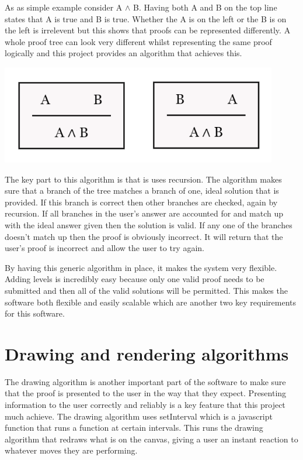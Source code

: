 As as simple example consider A $\wedge$ B. Having both A and B on the top line states that A is true and B is true. Whether the A is on the left or the B is on the left is irrelevent but this shows that proofs can be represented differently. A whole proof tree can look very different whilst representing the same proof logically and this project provides an algorithm that achieves this.

\centerline{\includegraphics[scale=0.5]{unification}}

 The key part to this algorithm is that is uses recursion. The algorithm makes sure that a branch of the tree matches a branch of one, ideal solution that is provided. If this branch is correct then other branches are checked, again by recursion. If all branches in the user's answer are accounted for and match up with the ideal answer given then the solution is valid. If any one of the branches doesn't match up then the proof is obviously incorrect. It will return that the user's proof is incorrect and allow the user to try again.

By having this generic algorithm in place, it makes the system very flexible. Adding levels is incredibly easy because only one valid proof needs to be submitted and then all of the valid solutions will be permitted. This makes the software both flexible and easily scalable which are another two key requirements for this software. 

\section{Drawing and rendering algorithms}

The drawing algorithm is another important part of the software to make sure that the proof is presented to the user in the way that they expect. Presenting information to the user correctly and reliably is a key feature that this project much achieve. The drawing algorithm uses setInterval which is a javascript function that runs a function at certain intervals. This runs the drawing algorithm that redraws what is on the canvas, giving a user an instant reaction to whatever moves they are performing.

